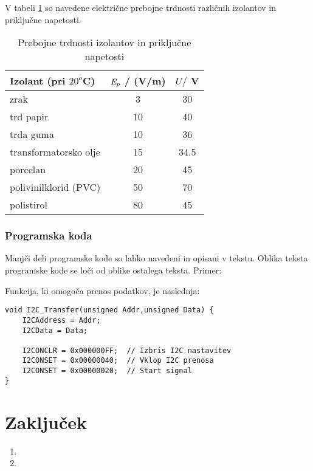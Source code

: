 \documentclass[a4paper,twoside,openright,12pt]{book}
\begin{document}
{V tabeli \ref{prebojne_trdnosti} so navedene električne prebojne
trdnosti različnih izolantov in priključne napetosti.

\begin{table}[h]
\centering
\begin{footnotesize}
\begin{tabular}{|l||c|c|}
 \hline Izolant (pri $20^o$C) & $\emph{E}_p$ / (V/m) & $U /$ V  \\
 \hline \hline
 zrak & 3  & 30 \\
 trd papir &  10 & 40 \\
 trda guma & 10  & 36 \\
  transformatorsko olje & 15 & 34.5 \\
   porcelan & 20 & 45 \\
   polivinilklorid (PVC) & 50 & 70 \\
    polistirol & 80  & 45\\
  \hline
\end{tabular}
\end{footnotesize}
  \caption{Prebojne trdnosti izolantov in priključne napetosti}
  \label{prebojne_trdnosti}
\end{table}

\subsection{Programska koda}

Manjči deli programske kode so lahko navedeni in opisani v tekstu.
Oblika teksta programske kode se loči od oblike ostalega teksta.
Primer:

Funkcija, ki omogoča prenos podatkov, je naslednja:

\small
\begin{verbatim}
void I2C_Transfer(unsigned Addr,unsigned Data) {
    I2CAddress = Addr;
    I2CData = Data;

    I2CONCLR = 0x000000FF;  // Izbris I2C nastavitev
    I2CONSET = 0x00000040;  // Vklop I2C prenosa
    I2CONSET = 0x00000020;  // Start signal
}
\end{verbatim}
\normalsize
\chapter{Zaključek} \label{zakljucek}

\begin{enumerate}
	\item
	\item 
\end{enumerate}


}
\end{document}
